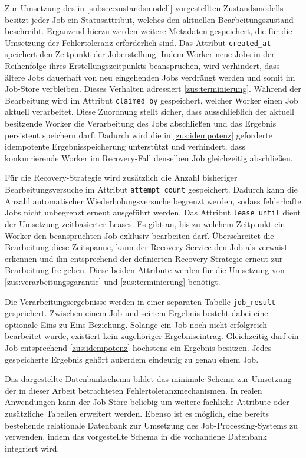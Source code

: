 Zur Umsetzung des in \cref{subsec:zustandsmodell} vorgestellten Zustandsmodells besitzt jeder Job ein Statusattribut, welches
den aktuellen Bearbeitungszustand beschreibt.
Ergänzend hierzu werden weitere Metadaten gespeichert, die für die Umsetzung der Fehlertoleranz erforderlich sind.
Das Attribut \texttt{created\_at} speichert den Zeitpunkt der Joberstellung.
Indem Worker neue Jobs in der Reihenfolge ihres Erstellungszeitpunkts beanspruchen, wird verhindert, dass ältere Jobs
dauerhaft von neu eingehenden Jobs verdrängt werden und somit im Job-Store verbleiben.
Dieses Verhalten adressiert \ref{zus:terminierung}.
Während der Bearbeitung wird im Attribut \texttt{claimed\_by} gespeichert, welcher Worker einen Job aktuell verarbeitet.
Diese Zuordnung stellt sicher, dass ausschließlich der aktuell besitzende Worker die Verarbeitung des Jobs abschließen und
das Ergebnis persistent speichern darf.
Dadurch wird die in \ref{zus:idempotenz} geforderte idempotente Ergebnisspeicherung unterstützt und verhindert, dass konkurrierende
Worker im Recovery-Fall denselben Job gleichzeitig abschließen.

Für die Recovery-Strategie wird zusätzlich die Anzahl bisheriger Bearbeitungsversuche im Attribut \texttt{attempt\_count} gespeichert.
Dadurch kann die Anzahl automatischer Wiederholungsversuche begrenzt werden, sodass fehlerhafte Jobs nicht unbegrenzt erneut ausgeführt werden.
Das Attribut \texttt{lease\_until} dient der Umsetzung zeitbasierter Leases.
Es gibt an, bis zu welchem Zeitpunkt ein Worker den beanspruchten Job exklusiv bearbeiten darf.
Überschreitet die Bearbeitung diese Zeitspanne, kann der Recovery-Service den Job als verwaist erkennen und ihn entsprechend
der definierten Recovery-Strategie erneut zur Bearbeitung freigeben.
Diese beiden Attribute werden für die Umsetzung von \ref{zus:verarbeitungsgarantie} und \ref{zus:terminierung} benötigt.

Die Verarbeitungsergebnisse werden in einer separaten Tabelle \texttt{job\_result} gespeichert.
Zwischen einem Job und seinem Ergebnis besteht dabei eine optionale Eins-zu-Eins-Beziehung.
Solange ein Job noch nicht erfolgreich bearbeitet wurde, existiert kein zugehöriger Ergebniseintrag.
Gleichzeitig darf ein Job entsprechend \ref{zus:idempotenz} höchstens ein Ergebnis besitzen.
Jedes gespeicherte Ergebnis gehört außerdem eindeutig zu genau einem Job.

Das dargestellte Datenbankschema bildet das minimale Schema zur Umsetzung der in dieser Arbeit betrachteten Fehlertoleranzmechanismen.
In realen Anwendungen kann der Job-Store beliebig um weitere fachliche Attribute oder zusätzliche Tabellen erweitert werden.
Ebenso ist es möglich, eine bereits bestehende relationale Datenbank zur Umsetzung des Job-Processing-Systems zu verwenden,
indem das vorgestellte Schema in die vorhandene Datenbank integriert wird.

